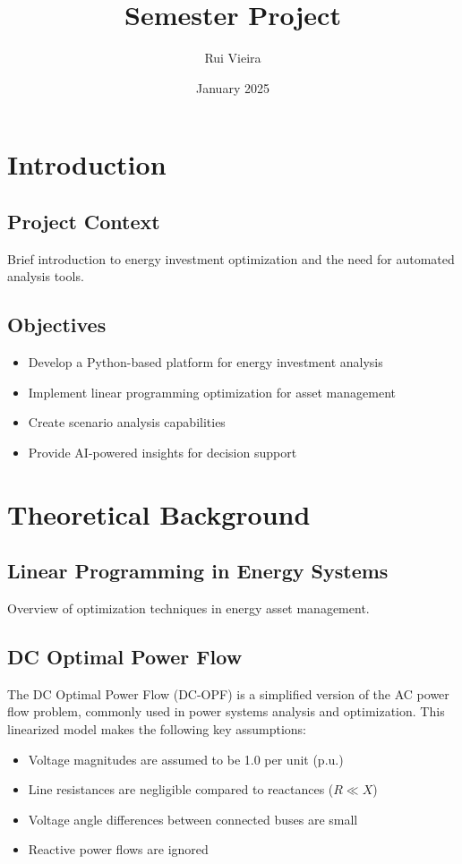 \documentclass{article}
\title{Semester Project}
\author{Rui Vieira}
\date{January 2025}
\begin{document}
\frontmatter 



\tableofcontents
\newpage

\section{Introduction}
\subsection{Project Context}
Brief introduction to energy investment optimization and the need for automated analysis tools.

\subsection{Objectives}
\begin{itemize}
    \item Develop a Python-based platform for energy investment analysis
    \item Implement linear programming optimization for asset management
    \item Create scenario analysis capabilities
    \item Provide AI-powered insights for decision support
\end{itemize}
\newpage

\section{Theoretical Background}
\subsection{Linear Programming in Energy Systems}
Overview of optimization techniques in energy asset management.

\subsection{DC Optimal Power Flow}
The DC Optimal Power Flow (DC-OPF) is a simplified version of the AC power flow problem, commonly used in power systems analysis and optimization. This linearized model makes the following key assumptions:

\begin{itemize}
    \item Voltage magnitudes are assumed to be 1.0 per unit (p.u.)
    \item Line resistances are negligible compared to reactances ($R \ll X$)
    \item Voltage angle differences between connected buses are small
    \item Reactive power flows are ignored
\end{itemize}
\end{document}
